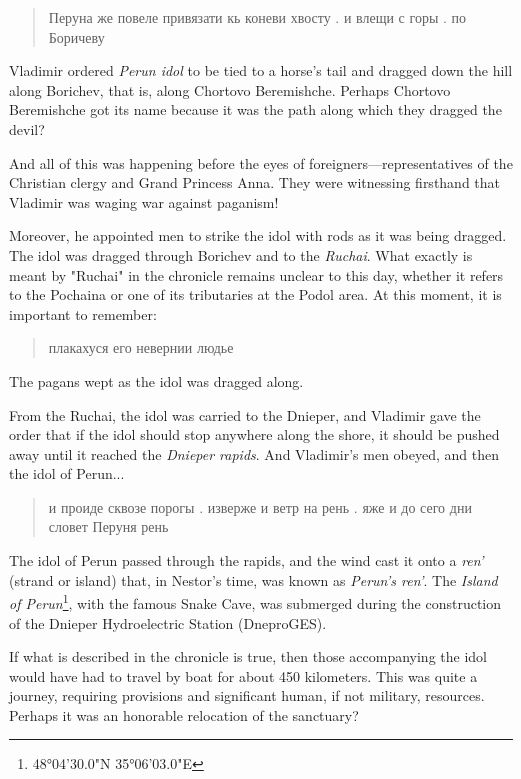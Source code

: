 \documentclass[a5paper,11pt,openany]{article}
\begin{document}
\begin{quotation}
\noindent Перуна же повеле привязати кь коневи хвосту . и влещи с горы . по Боричеву 
\end{quotation}

Vladimir ordered \textit{Perun idol} to be tied to a horse's tail and dragged down the hill along Borichev, that is, along Chortovo Beremishche. Perhaps Chortovo Beremishche got its name because it was the path along which they dragged the devil?

And all of this was happening before the eyes of foreigners—representatives of the Christian clergy and Grand Princess Anna. They were witnessing firsthand that Vladimir was waging war against paganism!

Moreover, he appointed men to strike the idol with rods as it was being dragged. The idol was dragged through Borichev and to the \textit{Ruchai}. What exactly is meant by "Ruchai" in the chronicle remains unclear to this day, whether it refers to the Pochaina or one of its tributaries at the Podol area. At this moment, it is important to remember:

\begin{quotation}
\noindent плакахуся его невернии людье 
\end{quotation}

The pagans wept as the idol was dragged along.

From the Ruchai, the idol was carried to the Dnieper, and Vladimir gave the order that if the idol should stop anywhere along the shore, it should be pushed away until it reached the \textit{Dnieper rapids}. And Vladimir's men obeyed, and then the idol of Perun...

\begin{quotation}
\noindent и проиде сквозе порогы . изверже
и ветр на рень . яже и до сего дни словет Перуня рень
\end{quotation}
  
The idol of Perun passed through the rapids, and the wind cast it onto a \textit{ren'} (strand or island) that, in Nestor's time, was known as \textit{Perun's ren'}. The \textit{Island of Perun}\footnote{48°04'30.0"N 35°06'03.0"E}, with the famous Snake Cave, was submerged during the construction of the Dnieper Hydroelectric Station (DneproGES).

If what is described in the chronicle is true, then those accompanying the idol would have had to travel by boat for about 450 kilometers. This was quite a journey, requiring provisions and significant human, if not military, resources. Perhaps it was an honorable relocation of the sanctuary?
\end{document}

